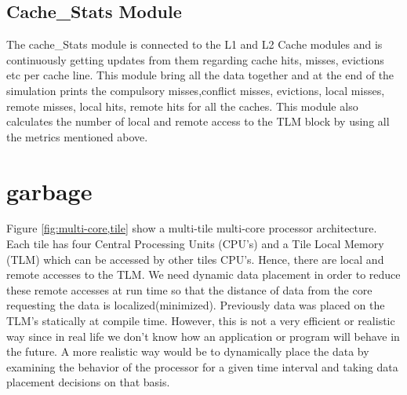 \documentclass{listhesis}
\begin{document}
\subsection{Cache{\_}Stats Module}
The cache{\_}Stats module is connected to the L1 and L2 Cache modules and is continuously getting updates from them regarding cache hits, misses, evictions etc per cache line. This module bring all the data together and at the end of the simulation prints the compulsory misses,conflict misses, evictions, local misses, remote misses, local hits, remote hits for all the caches. This module also calculates the number of local and remote access to the TLM block by using all the metrics mentioned above.
\section{garbage}
Figure \ref{fig:multi-core,tile} show a multi-tile multi-core processor architecture. Each tile has four Central Processing Units (CPU's) and a Tile Local Memory (TLM) which can be accessed by other tiles CPU's. Hence, there are local and remote accesses to the TLM. We need dynamic data placement in order to reduce these remote accesses at run time so that the distance of data from the core requesting the data is localized(minimized). Previously data was placed on the TLM's statically at compile time. However, this is not a very efficient or realistic way since in real life we don't know how an application or program will behave in the future. A more realistic way would be to dynamically place the data by examining the behavior of the processor for a given time interval and taking data placement decisions on that basis.
\end{document}
